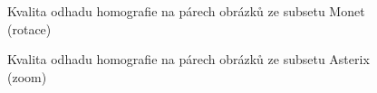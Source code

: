 \begin{figure}[htp] 
	\caption{Kvalita odhadu homografie na párech obrázků ze subsetu Monet (rotace)}	\label{graph_monet}
\end{figure}

\begin{figure}[htp] 
	\caption{Kvalita odhadu homografie na párech obrázků ze subsetu Asterix (zoom)}	\label{graph_asterix}
\end{figure}